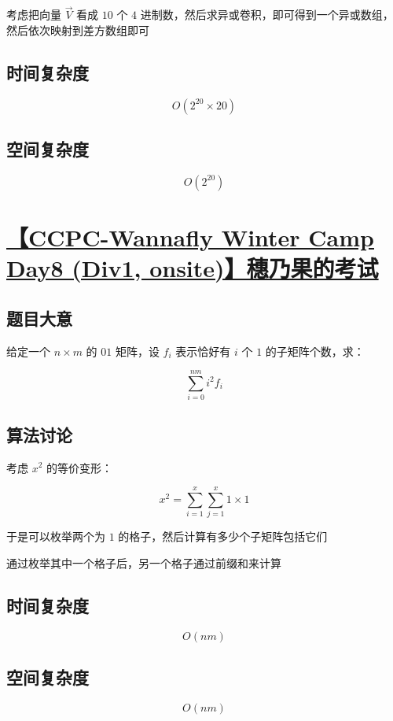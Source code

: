 \documentclass[UTF8]{article}
\begin{document}
考虑把向量 $\overrightarrow{V}$ 看成 $10$ 个 $4$ 进制数，然后求异或卷积，即可得到一个异或数组，然后依次映射到差方数组即可

\subsection{时间复杂度}

$$
O(2^{20} \times 20)
$$

\subsection{空间复杂度}

$$
O(2^{20})
$$

\section{\href{https://www.zhixincode.com/contest/28/problem/G?problem_id=410}{【CCPC-Wannafly Winter Camp Day8 (Div1, onsite)】穗乃果的考试}}

\subsection{题目大意}

给定一个 $n \times m$ 的 $01$ 矩阵，设 $f_i$ 表示恰好有 $i$ 个 $1$ 的子矩阵个数，求：

$$
\sum_{i=0}^{nm}i^2f_i
$$


\subsection{算法讨论}

考虑 $x^2$ 的等价变形：

$$
x^2=\sum_{i=1}^{x}\sum_{j=1}^{x}1 \times 1
$$

于是可以枚举两个为 $1$ 的格子，然后计算有多少个子矩阵包括它们

通过枚举其中一个格子后，另一个格子通过前缀和来计算

\subsection{时间复杂度}

$$
O(nm)
$$


\subsection{空间复杂度}

$$
O(nm)
$$
\end{document}
